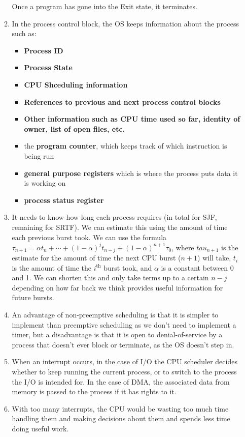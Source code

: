 \documentclass[12pt]{article}
\begin{document}
\begin{enumerate}
\begin{enumerate}
                        Once a program has gone into the Exit state, it terminates.
                  \item In the process control block, the OS keeps information about the process such as: \begin{itemize}
                              \item \textbf{Process ID}
                              \item \textbf{Process State}
                              \item \textbf{CPU Shceduling information}
                              \item \textbf{References to previous and next process control blocks}
                              \item \textbf{Other information such as CPU time used so far, identity of owner, list of open files, etc.}
                              \item the \textbf{program counter}, which keeps track of which instruction is being run
                              \item \textbf{general purpose registers} which is where the process puts data it is working on
                              \item \textbf{process status register}
                        \end{itemize}
                  \item It needs to know how long each process requires (in total for SJF, remaining for SRTF). We can estimate this using the amount of time each previous burst took. We can use the formula $\tau_{n+1} = \alpha t_n + \cdots + (1 - \alpha)^j t_{n-j} + (1-\alpha)^{n+1} \tau_0$, where $tau_{n+1}$ is the estimate for the amount of time the next CPU burst ($n+1$) will take, $t_i$ is the amount of time the $i^\text{th}$ burst took, and $\alpha$ is a constant between 0 and 1. We can shorten this and only take terms up to a certain $n - j$ depending on how far back we think provides useful information for future bursts.
                  \item An advantage of non-preemptive scheduling is that it is simpler to implement than preemptive scheduling as we don't need to implement a timer, but a disadvantage is that it is open to denial-of-service by a process that doesn't ever block or terminate, as the OS doesn't step in.
                  \item When an interrupt occurs, in the case of I/O the CPU scheduler decides whether to keep running the current process, or to switch to the process the I/O is intended for. In the case of DMA, the associated data from memory is passed to the process if it has rights to it.
                  \item With too many interrupts, the CPU would be wasting too much time handling them and making decisions about them and spends less time doing useful work. 
            \end{enumerate}
\end{enumerate}
\end{document}
